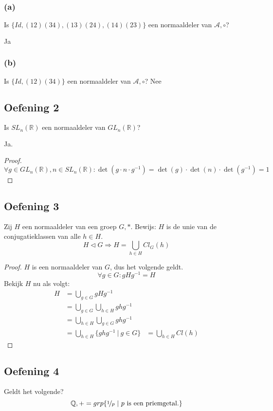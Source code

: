 \documentclass[main.tex]{subfiles}
\begin{document}
\subsubsection*{(a)}
Is $\{ Id, (12)(34),(13)(24),(14)(23) \}$ een normaaldeler van $\mathcal{A},\circ$?
 
Ja
\waarom
\subsubsection*{(b)}
Is $\{ Id, (12)(34) \}$ een normaaldeler van $\mathcal{A},\circ$?
Nee
\waarom

\subsection*{Oefening 2}
\label{sec:oz4-oef2}
Is $SL_{n}(\mathbb{R})$ een normaaldeler van $GL_{n}(\mathbb{R})$?

Ja.
\begin{proof}
  \[ \forall g\in GL_{n}(\mathbb{R}), n\in SL_{n}(\mathbb{R}): \det(g\cdot n \cdot g^{-1}) = \det(g) \cdot \det(n) \cdot \det(g^{-1}) = 1 \]
\end{proof}

\subsection*{Oefening 3}
\label{sec:oz4-oef3}
Zij $H$ een normaaldeler van een groep $G,*$.
Bewijs: $H$ is de unie van de conjugatieklassen van alle $h\in H$.
\[ H \triangleleft G \Rightarrow H = \bigcup_{h\in H}Cl_{G}(h) \]
\begin{proof}
  $H$ is een normaaldeler van $G$, dus het volgende geldt. 
  \[ \forall g\in G: gHg^{-1} = H \]
  Bekijk $H$ nu als volgt:
  \[
  \begin{array}{rll}
    H &= \bigcup_{g\in G} gHg^{-1} &\\
      &= \bigcup_{g\in G} \bigcup_{h\in H} ghg^{-1} &\\
      &= \bigcup_{h\in H} \bigcup_{g\in G} ghg^{-1} &\\
      &= \bigcup_{h\in H} \{ ghg^{-1} \ |\ g\in G \} &= \bigcup_{h\in H}Cl(h)
  \end{array}
  \]
\end{proof}

\subsection*{Oefening 4}
\label{sec:oz4-oef4}
Geldt het volgende?
\[ \mathbb{Q},+=grp\{\nicefrac{1}{p} \ |\ p \text{ is een priemgetal.} \} \] 
\end{document}
